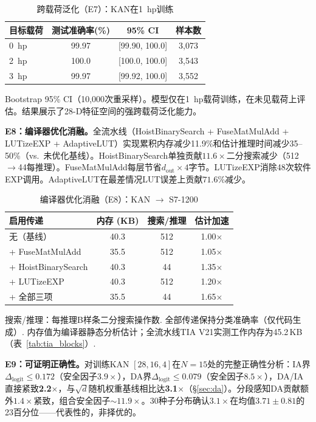 \documentclass[journal,onecolumn]{IEEEtran}
\theoremstyle{definition}
\theoremstyle{plain}
\theoremstyle{remark}
\begin{document}
\begin{table}[!t]
\centering
\caption{跨载荷泛化（E7）：KAN在1~hp训练}
\label{tab:cross_load}
\begin{tabular}{lccc}
\toprule
\textbf{目标载荷} & \textbf{测试准确率(\%)} & \textbf{95\% CI} & \textbf{样本数} \\
\midrule
0~hp & 99.97 & [99.90, 100.0] & 3,073 \\
2~hp & 100.0 & [100.0, 100.0] & 3,543 \\
3~hp & 99.97 & [99.92, 100.0] & 3,552 \\
\bottomrule
\end{tabular}
\vspace{1pt}
{\scriptsize Bootstrap 95\% CI（10,000次重采样）。模型仅在1~hp载荷训练，在未见载荷上评估。结果展示了28-D特征空间的强跨载荷泛化能力。}
\end{table}

\noindent\textbf{E8：编译器优化消融。}全流水线（HoistBinarySearch + FuseMatMulAdd + LUTizeEXP + AdaptiveLUT）实现累积内存减少11.9\%和估计推理时间减少35--50\%（vs.\ 未优化基线）。HoistBinarySearch单独贡献$11.6\times$二分搜索减少（512$\to$44每推理）。FuseMatMulAdd每层节省$d_{\text{out}} \times 4$字节。LUTizeEXP消除48次软件EXP调用。AdaptiveLUT在最差情况LUT误差上贡献$71.6\%$减少。

\begin{table}[!t]
\centering
\caption{编译器优化消融（E8）：KAN $\to$ S7-1200}
\label{tab:opt_ablation}
\footnotesize
\begin{tabular}{@{}lccc@{}}
\toprule
\textbf{启用传递} & \textbf{内存 (KB)} & \textbf{搜索/推理} & \textbf{估计加速} \\
\midrule
无（基线）            & 40.3 & 512 & 1.00$\times$ \\
+ FuseMatMulAdd        & 35.5 & 512 & 1.05$\times$ \\
+ HoistBinarySearch    & 40.3 & 44  & 1.35$\times$ \\
+ LUTizeEXP            & 40.3 & 512 & 1.20$\times$ \\
+ 全部三项             & 35.5 & 44  & 1.65$\times$ \\
\bottomrule
\end{tabular}
\vspace{1pt}
{\scriptsize 搜索/推理：每推理B样条二分搜索操作数. 全部传递保持分类准确率（仅代码生成）. 内存值为编译器静态分析估计；全流水线TIA V21实测工作内存为45.2\,KB（表~\ref{tab:tia_blocks}）.}
\end{table}

\noindent\textbf{E9：可证明正确性。}对训练KAN $[28,16,4]$在$N=15$处的完整正确性分析：IA界$\Delta_{\text{logit}} \leq 0.172$（安全因子$3.9\times$），DA界$\Delta_{\text{logit}} \leq 0.079$（安全因子$8.5\times$），DA/IA直接紧致\textbf{2.2$\times$}，与$\sqrt{d}$随机权重基线相比达\textbf{3.1$\times$}（{\S}\ref{sec:da}）。分段感知DA贡献额外$1.4\times$紧致，组合安全因子$\sim 11.9\times$。30种子分布确认$3.1\times$在均值$3.71 \pm 0.81$的23百分位——代表性的，非择优的。
\end{document}
